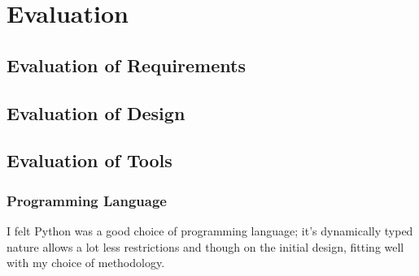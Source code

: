 \chapter{Evaluation}





\section{Evaluation of Requirements}


\section{Evaluation of Design}


\section{Evaluation of Tools}

\subsection{Programming Language}
I felt Python was a good choice of programming language; it's dynamically typed nature allows a
lot less restrictions and though on the initial design, fitting well with my choice of 
methodology.

